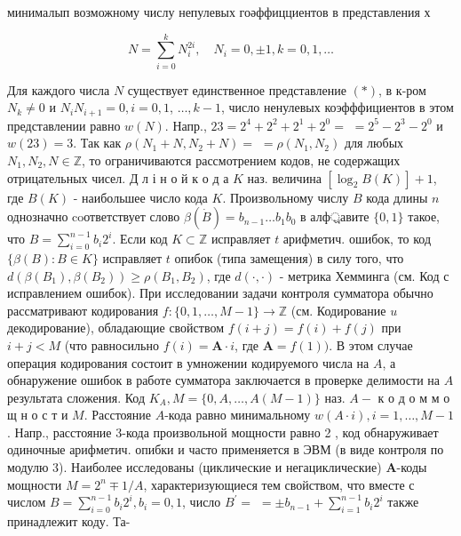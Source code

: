\documentclass[10pt]{article}
\begin{document}
минималып возможному числу непулевых гоәффицциентов в представления х



\[

N=\sum_{i=0}^{k} N_{i}^{2 i}, \quad N_{i}=0, \pm 1, k=0,1, \ldots

\]



Для каждого числа $N$ существует единственное представление $(*)$, в к-ром $N_{k} \neq 0$ и $N_{i} N_{i+1}=0, i=0,1$, $\ldots, k-1$, число ненулевых коэфффициентов в этом представлении равно $w(N)$. Напр., $23=2^{4}+2^{2}+2^{1}+2^{0}=$ $=2^{5}-2^{3}-2^{0}$ и $w(23)=3$. Так как $\rho\left(N_{1}+N, N_{2}+N\right)=$ $=\rho\left(N_{1}, N_{2}\right)$ для любых $N_{1}, N_{2}, N \in \mathbb{Z}$, то ограничиваются рассмотрением кодов, не содержащих отрицательных чисел. Д л і н о й к о д а $K$ наз. величина $\left[\log _{2} B(K)\right]+1$, где $B(K)$ - наибольшее число кода $K$. Произвольному числу $B$ кода длины $n$ однозначно coответствует слово $\beta(\dot{B})=b_{n-1} \ldots b_{1} b_{0}$ в алф্রавите $\{0,1\}$ такое, что $B=\sum_{i=0}^{n-1} b_{i} 2^{i}$. Если код $K \subset \mathbb{Z}$ исправляет $t$ арифметич. ошибок, то код $\{\beta(B): B \in K\}$ исправляет $t$ опибок (типа замещения) в силу того, что $d\left(\beta\left(B_{1}\right), \beta\left(B_{2}\right)\right) \geqslant \rho\left(B_{1}, B_{2}\right)$, где $d(\cdot, \cdot)$ - метрика Хемминга (см. Код с исправлением ошибок). При исследовании задачи контроля сумматора обычно рассматривают кодирования $f:\{0,1, \ldots, M-1\} \rightarrow \mathbb{Z}$ (см. Кодирование $u$ декодирование), обладающие свойством $f(i+j)=f(i)+f(j)$ при $i+j<M$ (что равносильно $f(i)=\boldsymbol{A} \cdot i$, где $\boldsymbol{A}=f(1))$. В этом случае операция кодирования состоит в умножении кодируемого числа на $A$, а обнаружение ошибок в работе сумматора заключается в проверке делимости на $A$ результата сложения. Код $K_{A}, M=\{0, A, \ldots, A(M-1)\}$ наз. $A-$ к о д о м м о щ н о с т и $M$. Расстояние $A$-кода равно минимальному $w(A \cdot i), i=1, \ldots, M-1$. Напр., расстояние 3-кода произвольной мощности равно 2 , код обнаруживает одиночные арифметич. опибки и часто применяется в ЭВМ (в виде контроля по модулю 3). Наиболее исследованы (циклические и негациклические) $\boldsymbol{A}$-коды мощности $M=2^{n} \mp 1 / A$, характеризующиеся тем свойством, что вместе с числом $B=\sum_{i=0}^{n-1} b_{i} 2^{i}, b_{i}=0,1$, число $B^{\prime}=$ $= \pm b_{n-1}+\sum_{i=1}^{n-1} b_{i} 2^{i}$ также принадлежит коду. Та-
\end{document}
